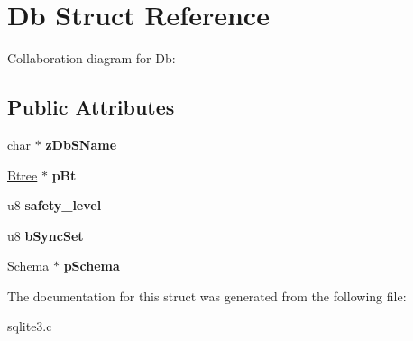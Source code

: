 \hypertarget{structDb}{}\section{Db Struct Reference}
\label{structDb}


Collaboration diagram for Db\+:
\subsection*{Public Attributes}
\begin{DoxyCompactItemize}
\item 
char $\ast$ {\bfseries z\+Db\+S\+Name}\hypertarget{structDb_a3129038e85466e764d1c866af0c9b3a2}{}\label{structDb_a3129038e85466e764d1c866af0c9b3a2}

\item 
\hyperlink{structBtree}{Btree} $\ast$ {\bfseries p\+Bt}\hypertarget{structDb_a0633e5a6abfc39246d07cc6a417a5852}{}\label{structDb_a0633e5a6abfc39246d07cc6a417a5852}

\item 
u8 {\bfseries safety\+\_\+level}\hypertarget{structDb_a04597a5c023d8b328193450b177ff24c}{}\label{structDb_a04597a5c023d8b328193450b177ff24c}

\item 
u8 {\bfseries b\+Sync\+Set}\hypertarget{structDb_a37f3a8593c9d7042c1c26dd492c409e4}{}\label{structDb_a37f3a8593c9d7042c1c26dd492c409e4}

\item 
\hyperlink{structSchema}{Schema} $\ast$ {\bfseries p\+Schema}\hypertarget{structDb_afd8647a83a4a7053231b92814520d6d4}{}\label{structDb_afd8647a83a4a7053231b92814520d6d4}

\end{DoxyCompactItemize}


The documentation for this struct was generated from the following file\+:\begin{DoxyCompactItemize}
\item 
sqlite3.\+c\end{DoxyCompactItemize}
